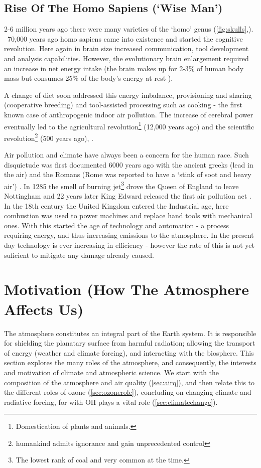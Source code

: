 \subsection{Rise Of The Homo Sapiens (`Wise Man')}
2-6 million years ago there were many varieties of the `homo' genus (\autoref{fig:skulls},\cite{skull}). ~70,000 years ago homo sapiens came into existence and started the cognitive revolution. Here again in brain size increased communication, tool development and analysis capabilities. However, the evolutionary brain enlargement required an increase in net energy intake \citep{brainenergy} (the brain makes up for 2-3\% of human body mass but consumes 25\% of the body's energy at rest \citep{sapiens}).

A change of diet \citep{diet} soon addressed this energy imbalance, provisioning and sharing (cooperative breeding) and tool-assisted processing such as cooking \citep{cooking} - the first known case of anthropogenic indoor air pollution. The increase of cerebral power eventually led to the agricultural revolution\footnote{Domestication of plants and animals.} (12,000 years ago) and the scientific revolution\footnote{ humankind admits ignorance and gain unprecedented control} (500 years ago), \citep{sapiens}.

 Air pollution and climate have always been a concern for the human race. Such disquietude was first documented 6000 years ago with the ancient greeks  (lead in the air) \citep{skeptical} and the Romans (Rome was reported to have a `stink of soot and heavy air') \citep{roman}. In 1285 the smell of burning jet\footnote{The lowest rank of coal and very common at the time.} drove the Queen of England to leave Nottingham and 22 years later King Edward released the first air pollution act \citep{coal1}. In the 18th century the United Kingdom entered the Industrial age, here combustion was used to power machines and replace hand tools with mechanical ones. With this started the age of technology and automation - a process requiring energy, and thus increasing emissions to the atmosphere. In the present day technology is ever increasing in efficiency - however the rate of this is not yet suficient to mitigate any damage already caused.


\section{Motivation (How The Atmosphere Affects Us)}
The atmosphere constitutes an integral part of the Earth system. It is responsible for shielding the planatary surface from harmful radiation; allowing the transport of energy (weather and climate forcing), and interacting with the biosphere. This section explores the many roles of the atmosphere, and consequently, the interests and motivation of climate and atmospheric science. We start with the composition of the atmosphere and air quality (\autoref{sec:airq}), and then relate this to the different roles of ozone (\autoref{sec:ozonerole}), concluding on changing climate and radiative forcing, for with OH plays a vital role (\autoref{sec:climatechange}).



